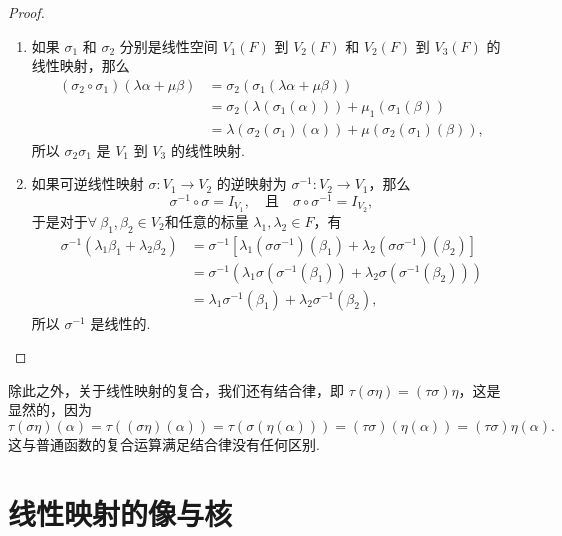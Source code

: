 \begin{proof}
\begin{enumerate}
    \item 如果 $\sigma_1$ 和 $\sigma_2$ 分别是线性空间 $V_1(F)$ 到 $V_2(F)$ 和 $V_2(F)$ 到 $V_3(F)$ 的线性映射，那么
    \begin{align*}
        (\sigma_2 \circ \sigma_1)(\lambda \alpha  + \mu \beta) & = \sigma_2(\sigma_1(\lambda \alpha  + \mu \beta)) \\
        & = \sigma_2(\lambda (\sigma_1(\alpha))) + \mu_1(\sigma_1(\beta)) \\
        & = \lambda (\sigma_2(\sigma_1)(\alpha)) + \mu (\sigma_2(\sigma_1)(\beta)),
    \end{align*}
    所以 $\sigma_2\sigma_1$ 是 $V_1$ 到 $V_3$ 的线性映射.

    \item 如果可逆线性映射 $\sigma: V_1 \to V_2$ 的逆映射为 $\sigma^{-1}: V_2 \to V_1$，那么
    \[
    \sigma^{-1} \circ \sigma = I_{V_1}, \quad \text{且} \quad \sigma \circ \sigma^{-1} = I_{V_2},
    \]
    于是对于$ \forall \ \beta_1,\beta_2 \in V_2$和任意的标量 $\lambda_1, \lambda_2 \in F$，有
    \begin{align*}
        \sigma^{-1}(\lambda_1 \beta_1 + \lambda_2 \beta_2) & = \sigma^{-1}\left[ \lambda_1(\sigma \sigma^{-1})(\beta_1)+\lambda_2(\sigma \sigma^{-1})(\beta_2)\right] \\
        &= \sigma^{-1}(\lambda_1 \sigma(\sigma^{-1}(\beta_1)) + \lambda_2 \sigma(\sigma^{-1}(\beta_2))) \\
        & = \lambda_1 \sigma^{-1}(\beta_1) + \lambda_2 \sigma^{-1}(\beta_2),
    \end{align*}
    所以 $\sigma^{-1}$ 是线性的.
\end{enumerate}
\end{proof}

除此之外，关于线性映射的复合，我们还有结合律，即 $\tau(\sigma\eta) = (\tau\sigma)\eta$，这是显然的，因为
\[\tau(\sigma\eta)(\alpha) = \tau((\sigma\eta)(\alpha)) = \tau(\sigma(\eta(\alpha))) = (\tau\sigma)(\eta(\alpha)) = (\tau\sigma)\eta(\alpha).\]
这与普通函数的复合运算满足结合律没有任何区别.

\section{线性映射的像与核}

